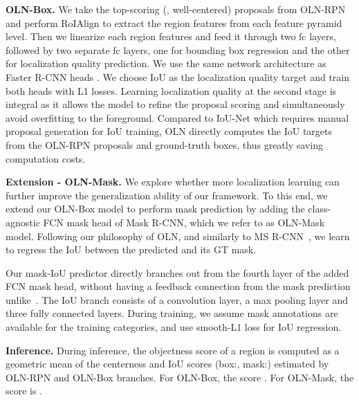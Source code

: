 \documentclass[10pt,twocolumn,letterpaper]{article}
\newcommand{\OURS}{OLN}
\renewcommand{\paragraph}[1]{\vspace{1mm}\noindent\textbf{#1}}
\begin{document}
\paragraph{OLN-Box.} \quad
We take the top-scoring (\eg, well-centered) proposals from OLN-RPN and perform RoIAlign \cite{he2017mask} to extract the region features from each feature pyramid level. Then we linearize each region features and feed it through two fc layers, followed by two separate fc layers, one for bounding box regression and the other for localization quality prediction. We use the same network architecture as Faster R-CNN heads \cite{fasterNIPS2015}. We choose IoU as the localization quality target and train both heads with L1 losses. Learning localization quality at the second stage is integral as it allows the model to refine the proposal scoring and simultaneously avoid overfitting to the foreground. Compared to IoU-Net which requires manual proposal generation for IoU training, \OURS{} directly computes the IoU targets from the OLN-RPN proposals and ground-truth boxes, thus greatly saving computation costs.


\noindent \textbf{Extension - \OURS{}-Mask.} \quad
We explore whether more localization learning can further improve the generalization ability of our framework. To this end, we extend our \OURS{}-Box model to perform mask prediction by adding the class-agnostic FCN mask head of Mask R-CNN, which we refer to as \OURS{}-Mask model. Following our philosophy of \OURS{}, and similarly to MS R-CNN~\cite{huang2019mask}, we learn to regress the IoU between the predicted and its GT mask. 

Our mask-IoU predictor directly branches out from the fourth layer of the added FCN mask head, without having a feedback connection from the mask prediction unlike~\cite{huang2019mask}. The IoU branch consists of a  convolution layer, a max pooling layer and three fully connected layers. During training, we assume mask annotations are available for the training categories, and use smooth-L1 loss for IoU regression.


\paragraph{Inference.}\quad 
During inference, the objectness score of a region  is computed as a geometric mean of the centerness  and IoU scores (box:, mask:) estimated by OLN-RPN and OLN-Box branches. For OLN-Box, the score . For OLN-Mask, the score is .
\end{document}
